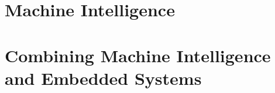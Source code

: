 \section{Machine Intelligence}\label{sec:machineintelligence}\label{\automlabel}
\eal

\section{Combining Machine Intelligence and Embedded Systems}\label{sec:combmies}\label{\automlabel}
\eal